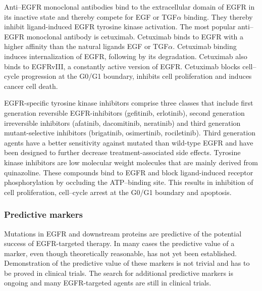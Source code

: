 {{{      Anti--EGFR monoclonal antibodies bind to the extracellular domain of EGFR
      in its inactive state and thereby compete for EGF or TGF$\alpha$ binding.
      They thereby inhibit ligand-induced EGFR tyrosine kinase activation. The
      most popular anti--EGFR monoclonal antibody is cetuximab. Cetuximab binds
      to EGFR with a higher affinity than the natural ligands EGF or
      TGF$\alpha$. Cetuximab binding induces internalization of EGFR, following
      by its degradation. Cetuximab also binds to EGFRvIII, a constantly active
      version of EGFR. Cetuximab blocks cell--cycle  progression at the G0/G1
      boundary, inhibits cell proliferation and induces cancer cell death.

      EGFR-specific tyrosine kinase inhibitors comprise three classes that
      include first generation reversible  EGFR-inhibitors (gefitinib,
      erlotinib), second generation irreversible inhibitors (afatinib,
      dacomitinib, neratinib) and third generation mutant-selective inhibitors
      (brigatinib, osimertinib, rociletinib). Third generation agents have a
      better sensitivity against mutated than wild-type EGFR and have been
      designed to further decrease treatment-associated side effects. Tyrosine
      kinase inhibitors are low molecular weight molecules that are mainly
      derived from quinazoline. These compounds bind to EGFR and block
      ligand-induced receptor phosphorylation by occluding the ATP--binding
      site. This results in inhibition of cell proliferation, cell--cycle arrest
      at the G0/G1 boundary and apoptosis.

    \subsubsection{Predictive markers}

      Mutations in EGFR and downstream proteins are predictive of the potential
      success of EGFR-targeted therapy. In many cases the predictive value of a
      marker, even though theoretically reasonable, has not yet been
      established. Demonstration of the predictive value of these markers is not
      trivial and has to be proved in clinical trials. The search for
      additional predictive markers is ongoing and many EGFR-targeted
      agents are still in clinical trials.

}}}
